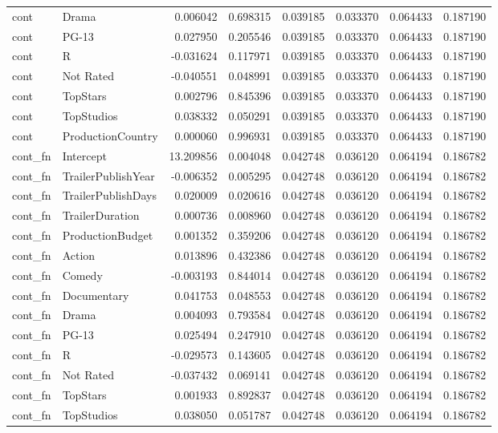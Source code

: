 \begin{tabular}{llrrrrrr}
cont & Drama & 0.006042 & 0.698315 & 0.039185 & 0.033370 & 0.064433 & 0.187190 \\
cont & PG-13 & 0.027950 & 0.205546 & 0.039185 & 0.033370 & 0.064433 & 0.187190 \\
cont & R & -0.031624 & 0.117971 & 0.039185 & 0.033370 & 0.064433 & 0.187190 \\
cont & Not Rated & -0.040551 & 0.048991 & 0.039185 & 0.033370 & 0.064433 & 0.187190 \\
cont & TopStars & 0.002796 & 0.845396 & 0.039185 & 0.033370 & 0.064433 & 0.187190 \\
cont & TopStudios & 0.038332 & 0.050291 & 0.039185 & 0.033370 & 0.064433 & 0.187190 \\
cont & ProductionCountry & 0.000060 & 0.996931 & 0.039185 & 0.033370 & 0.064433 & 0.187190 \\
cont_fn & Intercept & 13.209856 & 0.004048 & 0.042748 & 0.036120 & 0.064194 & 0.186782 \\
cont_fn & TrailerPublishYear & -0.006352 & 0.005295 & 0.042748 & 0.036120 & 0.064194 & 0.186782 \\
cont_fn & TrailerPublishDays & 0.020009 & 0.020616 & 0.042748 & 0.036120 & 0.064194 & 0.186782 \\
cont_fn & TrailerDuration & 0.000736 & 0.008960 & 0.042748 & 0.036120 & 0.064194 & 0.186782 \\
cont_fn & ProductionBudget & 0.001352 & 0.359206 & 0.042748 & 0.036120 & 0.064194 & 0.186782 \\
cont_fn & Action & 0.013896 & 0.432386 & 0.042748 & 0.036120 & 0.064194 & 0.186782 \\
cont_fn & Comedy & -0.003193 & 0.844014 & 0.042748 & 0.036120 & 0.064194 & 0.186782 \\
cont_fn & Documentary & 0.041753 & 0.048553 & 0.042748 & 0.036120 & 0.064194 & 0.186782 \\
cont_fn & Drama & 0.004093 & 0.793584 & 0.042748 & 0.036120 & 0.064194 & 0.186782 \\
cont_fn & PG-13 & 0.025494 & 0.247910 & 0.042748 & 0.036120 & 0.064194 & 0.186782 \\
cont_fn & R & -0.029573 & 0.143605 & 0.042748 & 0.036120 & 0.064194 & 0.186782 \\
cont_fn & Not Rated & -0.037432 & 0.069141 & 0.042748 & 0.036120 & 0.064194 & 0.186782 \\
cont_fn & TopStars & 0.001933 & 0.892837 & 0.042748 & 0.036120 & 0.064194 & 0.186782 \\
cont_fn & TopStudios & 0.038050 & 0.051787 & 0.042748 & 0.036120 & 0.064194 & 0.186782 \\

\end{tabular}
